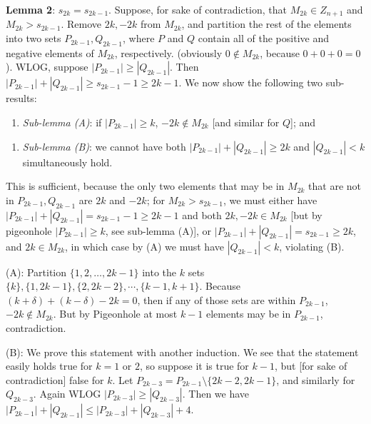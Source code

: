 \begin{enumerate}
 
\textbf{Lemma 2}: $s_{2k} = s_{2k-1}$. Suppose, for sake of contradiction, that $M_{2k} \in Z_{n+1}$ and $M_{2k} > s_{2k-1}$. Remove $2k,-2k$ from $M_{2k}$, and partition the rest of the elements into two sets $P_{2k-1}, Q_{2k-1}$, where $P$ and $Q$ contain all of the positive and negative elements of $M_{2k}$, respectively. (obviously $0 \not \in M_{2k}$, because $0+0+0 = 0$). WLOG, suppose $|P_{2k-1}| \ge |Q_{2k-1}|$. Then $|P_{2k-1}| + |Q_{2k-1}| \ge s_{2k-1} - 1 \ge 2k - 1$. We now show the following two sub-results:

 


 
            \begin{enumerate}[label=(\roman*)]
                \item \textit{Sub-lemma (A)}: if $|P_{2k-1}| \ge k$, $-2k \not \in M_{2k}$ [and similar for $Q$]; and
            \end{enumerate}
            


 
            \begin{enumerate}[label=(\roman*)]
                \item \textit{Sub-lemma (B)}: we cannot have both $|P_{2k-1}| + |Q_{2k-1}| \ge 2k$ and $|Q_{2k-1}| < k$ simultaneously hold.
            \end{enumerate}
            
This is sufficient, because the only two elements that may be in $M_{2k}$ that are not in $P_{2k-1}, Q_{2k-1}$ are $2k$ and $-2k$; for $M_{2k} > s_{2k-1}$, we must either have $|P_{2k-1}| + |Q_{2k-1}| = s_{2k-1} - 1 \ge 2k-1$ and both $2k,-2k \in M_{2k}$ [but by pigeonhole $|P_{2k-1}| \ge k$, see sub-lemma (A)], or $|P_{2k-1}| + |Q_{2k-1}| = s_{2k-1} \ge 2k$, and $2k \in M_{2k}$, in which case by (A) we must have $|Q_{2k-1}| < k$, violating (B).

 
(A): Partition $\{1,2,\ldots,2k-1\}$ into the $k$ sets $\{k\}, \{1,2k-1\}, \{2, 2k-2\}, \cdots, \{k-1, k+1\}$. Because $(k+\delta) + (k-\delta) - 2k = 0$, then if any of those sets are within $P_{2k-1}$, $-2k \not \in M_{2k}$. But by Pigeonhole at most $k-1$ elements may be in $P_{2k-1}$, contradiction. 

 
(B): We prove this statement with another induction. We see that the statement easily holds true for $k=1$ or $2$, so suppose it is true for $k-1$, but [for sake of contradiction] false for $k$. Let $P_{2k-3} = P_{2k-1} \setminus \{2k-2, 2k-1\}$, and similarly for $Q_{2k-3}$. Again WLOG $|P_{2k-3}| \ge |Q_{2k-3}|$. Then we have $|P_{2k-1}| + |Q_{2k-1}| \le |P_{2k-3}| + |Q_{2k-3}| + 4$.


\end{enumerate}
